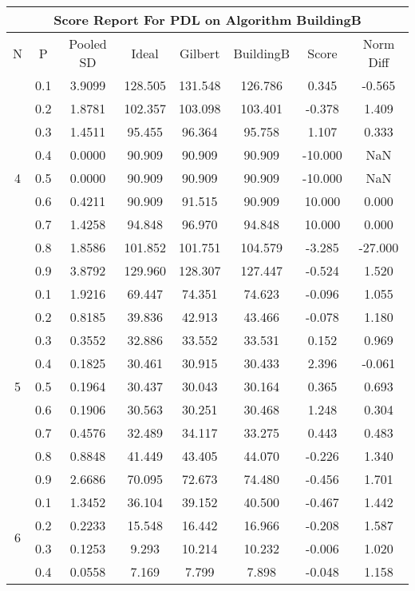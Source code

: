 \documentclass[11pt,a4paper]{report}
\begin{document}
\begin{longtable}{ | c | c || c | c | c | c | c | c | }
\hline
\multicolumn{8}{|c|}{ Score Report For PDL on Algorithm BuildingB} \\
\hline
N & P & Pooled SD &  Ideal &  Gilbert & BuildingB  & Score & Norm Diff \\
 \hline
 \hline
 \endhead
\multirow{9}{*}{4} & 0.1 & 3.9099 & 128.505 & 131.548 & 126.786 & 0.345 & -0.565 \\
 & 0.2 & 1.8781 & 102.357 & 103.098 & 103.401 & -0.378 & 1.409 \\
 & 0.3 & 1.4511 & 95.455 & 96.364 & 95.758 & 1.107 & 0.333 \\
 & 0.4 & 0.0000 & 90.909 & 90.909 & 90.909 & -10.000 & NaN \\
 & 0.5 & 0.0000 & 90.909 & 90.909 & 90.909 & -10.000 & NaN \\
 & 0.6 & 0.4211 & 90.909 & 91.515 & 90.909 & 10.000 & 0.000 \\
 & 0.7 & 1.4258 & 94.848 & 96.970 & 94.848 & 10.000 & 0.000 \\
 & 0.8 & 1.8586 & 101.852 & 101.751 & 104.579 & -3.285 & -27.000 \\
 & 0.9 & 3.8792 & 129.960 & 128.307 & 127.447 & -0.524 & 1.520 \\
 \hline
\multirow{9}{*}{5} & 0.1 & 1.9216 & 69.447 & 74.351 & 74.623 & -0.096 & 1.055 \\
 & 0.2 & 0.8185 & 39.836 & 42.913 & 43.466 & -0.078 & 1.180 \\
 & 0.3 & 0.3552 & 32.886 & 33.552 & 33.531 & 0.152 & 0.969 \\
 & 0.4 & 0.1825 & 30.461 & 30.915 & 30.433 & 2.396 & -0.061 \\
 & 0.5 & 0.1964 & 30.437 & 30.043 & 30.164 & 0.365 & 0.693 \\
 & 0.6 & 0.1906 & 30.563 & 30.251 & 30.468 & 1.248 & 0.304 \\
 & 0.7 & 0.4576 & 32.489 & 34.117 & 33.275 & 0.443 & 0.483 \\
 & 0.8 & 0.8848 & 41.449 & 43.405 & 44.070 & -0.226 & 1.340 \\
 & 0.9 & 2.6686 & 70.095 & 72.673 & 74.480 & -0.456 & 1.701 \\
 \hline
\multirow{9}{*}{6} & 0.1 & 1.3452 & 36.104 & 39.152 & 40.500 & -0.467 & 1.442 \\
 & 0.2 & 0.2233 & 15.548 & 16.442 & 16.966 & -0.208 & 1.587 \\
 & 0.3 & 0.1253 & 9.293 & 10.214 & 10.232 & -0.006 & 1.020 \\
 & 0.4 & 0.0558 & 7.169 & 7.799 & 7.898 & -0.048 & 1.158 \\

\end{longtable}
\end{document}
